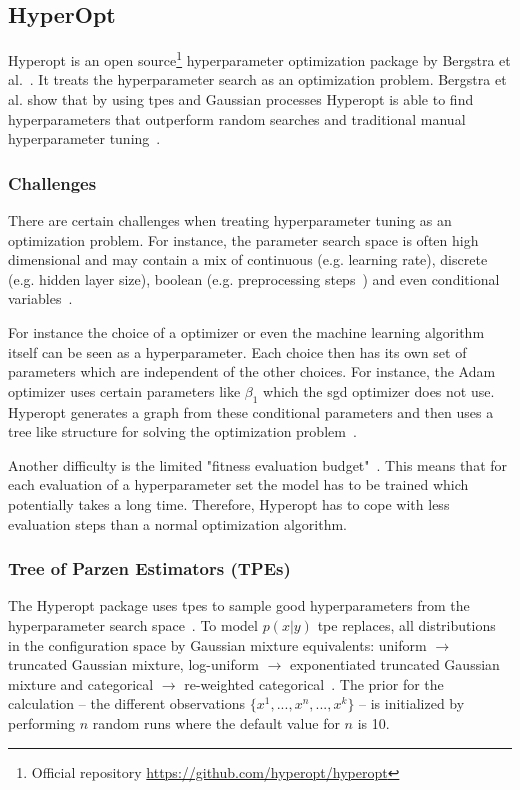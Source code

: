 \subsection{HyperOpt}

Hyperopt is an open source\footnote{Official repository \url{https://github.com/hyperopt/hyperopt}} hyperparameter optimization package by Bergstra et al.~\cite{Bergstra2013a}. It treats the hyperparameter search as an optimization problem. Bergstra et al. show that by using \glspl{tpe} and Gaussian processes Hyperopt is able to find hyperparameters that outperform random searches and traditional manual hyperparameter tuning~\cite{Bergstra2011}.




\subsubsection*{Challenges}

There are certain challenges when treating hyperparameter tuning as an optimization problem. For instance, the parameter search space is often high dimensional and may contain a mix of continuous {(e.g. learning rate)}, discrete {(e.g. hidden layer size)}, boolean {(e.g. preprocessing steps~\cite{Hutter2009})} and even conditional variables~\cite{Bergstra2013}. 

For instance the choice of a optimizer or even the machine learning algorithm itself can be seen as a hyperparameter. Each choice then has its own set of parameters which are independent of the other choices. For instance, the Adam optimizer uses certain parameters like $\beta_1$ which the \gls{sgd} optimizer does not use. Hyperopt generates a graph from these conditional parameters and then uses a tree like structure for solving the optimization problem~\cite{Bergstra2011}.
\newline

Another difficulty is the limited "fitness evaluation budget"~\cite{Bergstra2011}. This means that for each evaluation of a hyperparameter set the model has to be trained which potentially takes a long time. Therefore, Hyperopt has to cope with less evaluation steps than a normal optimization algorithm.

\subsubsection*{Tree of Parzen Estimators {(TPEs)}}
The Hyperopt package uses \glspl{tpe} to sample good hyperparameters from the hyperparameter search space~\cite{Bergstra2013a}. To model $p(x|y)$ \gls{tpe} replaces, all distributions in the configuration space by Gaussian mixture equivalents: uniform $\rightarrow$ truncated Gaussian mixture, log-uniform $\rightarrow$ exponentiated truncated Gaussian mixture and categorical $\rightarrow$ re-weighted categorical~\cite{Bergstra2013a}. The prior for the calculation -- the different observations $\{x^1,..., x^n, ..., x^k\}$ -- is initialized by performing $n$ random runs where the default value for $n$ is 10.

